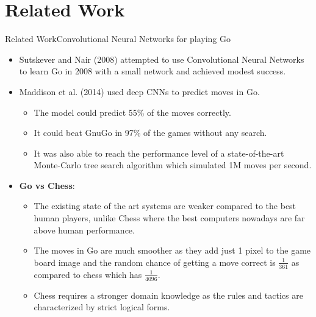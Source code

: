 \documentclass[9pt, unknownkeysallowed]{beamer}
\begin{document}
\section{Related Work}
\begin{frame}{Related Work}{Convolutional Neural Networks for playing Go}
\begin{itemize}[<+->]
 \item Sutskever and Nair (2008) attempted to use Convolutional Neural Networks to learn Go in 2008 with a small network and achieved modest success.
 \item Maddison et al. (2014) used deep CNNs to predict moves in Go. 
 \begin{itemize}
  \item The model could predict 55\% of the moves correctly. 
  \item It could beat GnuGo in 97\% of the games without any search. 
  \item It was also able to reach the performance level of a state-of-the-art Monte-Carlo tree search algorithm which simulated 1M moves per second.
 \end{itemize}
 \item \textbf{Go vs Chess}: 
 \begin{itemize}
  \item  The existing state of the art systems are weaker compared to the best human players, unlike Chess where the best computers nowadays are far above human performance.
  \item The moves in Go are much smoother as they add just 1 pixel to the game board image and the random chance of getting a move correct is $\frac{1}{361}$ as compared to chess which has $\frac{1}{4096}$. 
  \item Chess requires a stronger domain knowledge as the rules and tactics are characterized by  strict logical forms.
 \end{itemize}
\end{itemize}
\end{frame}
\end{document}
